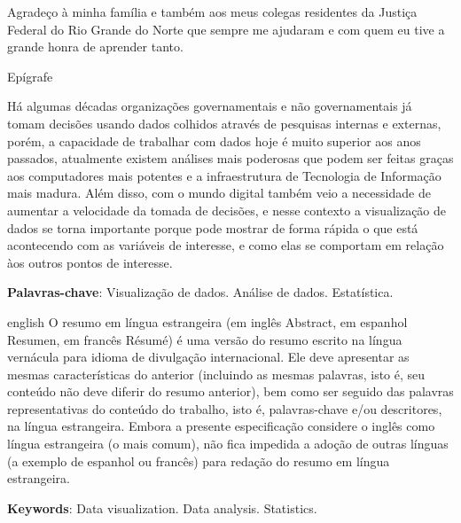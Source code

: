 \documentclass[
    12pt,				%
	oneside,            %
	a4paper,			%
	english,			%
	french,
	spanish,
	brazil				%
	]{abntex2}
\begin{document}
\begin{agradecimentos}
Agradeço à minha família e também aos meus colegas residentes da Justiça Federal do Rio Grande do Norte que sempre me ajudaram e com quem eu tive a grande honra de aprender tanto.
\end{agradecimentos}

\begin{epigrafe}
    \vspace*{\fill}
	\begin{flushright}
		Epígrafe
	\end{flushright}
\end{epigrafe}

\setlength{\absparsep}{18pt} %
\begin{resumo}
\vspace{\onelineskip}
Há algumas décadas organizações governamentais e não governamentais já tomam decisões usando dados colhidos através de pesquisas internas e externas, porém, a capacidade de trabalhar com dados hoje é muito superior aos anos passados, atualmente existem análises mais poderosas que podem ser feitas graças aos computadores mais potentes e a infraestrutura de Tecnologia de Informação mais madura. Além disso, com o mundo digital também veio a necessidade de aumentar a velocidade da tomada de decisões, e nesse contexto a visualização de dados se torna importante porque pode mostrar de forma rápida o que está acontecendo com as variáveis de interesse, e como elas se comportam em relação àos outros pontos de interesse.

\noindent\textbf{Palavras-chave}: Visualização de dados. Análise de dados. Estatística.
\end{resumo}

\begin{resumo}[Abstract]
\vspace{\onelineskip}
\begin{otherlanguage*}{english}
O resumo em língua estrangeira (em inglês Abstract, em espanhol Resumen, em francês Résumé) é uma versão do resumo escrito na língua vernácula para idioma de divulgação internacional. Ele deve apresentar as mesmas características do anterior (incluindo as mesmas palavras, isto é, seu conteúdo não deve diferir do resumo anterior), bem como ser seguido das palavras representativas do conteúdo do trabalho, isto é, palavras-chave e/ou descritores, na língua estrangeira. Embora a presente especificação considere o inglês como língua estrangeira (o mais comum), não fica impedida a adoção de outras línguas (a exemplo de espanhol ou francês) para redação do resumo em língua estrangeira.

\noindent\textbf{Keywords}: Data visualization. Data analysis. Statistics.
\end{otherlanguage*}
\end{resumo}
\end{document}

